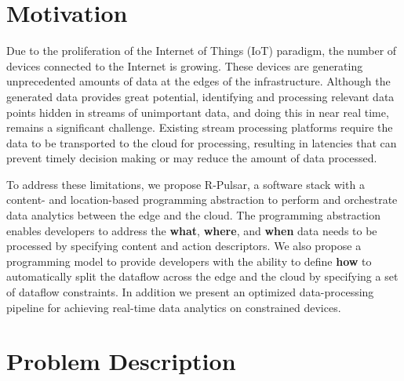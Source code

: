 \section{Motivation}

Due to the proliferation of the Internet of Things (IoT) paradigm, the number of devices connected to the Internet is growing. These devices are generating unprecedented amounts of data at the edges of the infrastructure. Although the generated data provides great potential, identifying and processing relevant data points hidden in streams of unimportant data, and doing this in near real time, remains a significant challenge. Existing stream processing platforms require the data to be transported to the cloud for processing, resulting in latencies that can prevent timely decision making or may reduce the amount of data processed.

To address these limitations, we propose R-Pulsar, a software stack with a content- and location-based programming abstraction to perform and orchestrate data analytics between the edge and the cloud. The programming abstraction enables developers to address the \textbf{what}, \textbf{where}, and \textbf{when} data needs to be processed by specifying content and action descriptors. We also propose a programming model to provide developers with the ability to define \textbf{how} to automatically split the dataflow across the edge and the cloud by specifying a set of dataflow constraints. In addition we present an optimized data-processing pipeline for achieving real-time data analytics on constrained devices.


\section{Problem Description}


